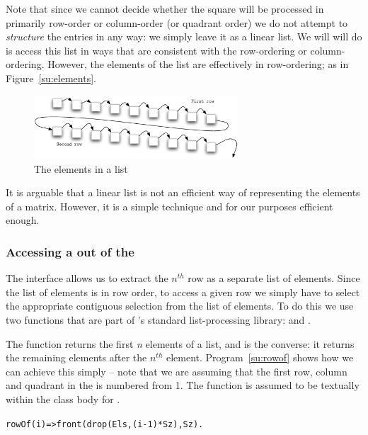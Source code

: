 Note that since we cannot decide whether the square will be processed in primarily row-order or column-order (or quadrant order) we do not attempt to \emph{structure} the entries in any way: we simply leave it as a linear list. We will will do is access this list in ways that are consistent with the row-ordering or column-ordering. However, the elements of the list are effectively in row-ordering; as in Figure~\vref{su:elements}.
\begin{figure}[h]
\centering
\includegraphics[width=3in]{elements}
\caption{\label{su:elements}The elements in a  list}
\end{figure}
\noindent
It is arguable that a linear list is not an efficient way of representing the elements of a matrix. However, it is a simple technique and for our purposes efficient enough.

\subsubsection{Accessing a  out of the }
The  interface allows us to extract the \emph{$n^{th}$} row as a separate list of elements. Since the list of elements is in row order, to access a given row we simply have to select the appropriate contiguous selection from the list of elements. To do this we use two functions that are part of \go's standard list-processing library:  and . 

The  function returns the first \emph{n} elements of a list, and  is the converse: it returns the remaining elements after the $n^{th}$ element.
Program~\vref{su:rowof} shows how we can achieve this simply -- note that we are assuming that the first row, column and quadrant in the  is numbered from 1. The  function is assumed to be textually within the class body for .
\begin{program}
\vspace{0.5ex}
\begin{alltt}
rowOf(i) => front(drop(Els,(i-1)*Sz),Sz).
\end{alltt}
\vspace{-2ex}
\caption{Accessing a  the square}
\label{su:rowof}
\end{program}

